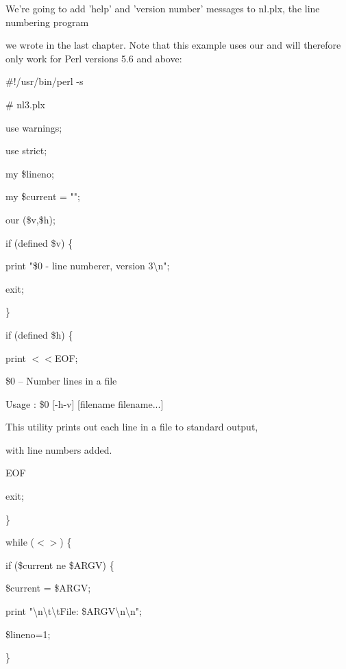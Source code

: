 \documentclass[a4paper,11pt]{book}
\begin{document}
\noindent 

\noindent We're going to add 'help' and 'version number' messages to nl.plx, the line numbering program

\noindent we wrote in the last chapter. Note that this example uses our and will therefore only work for Perl versions 5.6 and above:

\noindent 

\noindent \#!/usr/bin/perl -s

\noindent \# nl3.plx

\noindent use warnings;

\noindent use strict;

\noindent 

\noindent my \$lineno;

\noindent my \$current = "";

\noindent our (\$v,\$h);

\noindent 

\noindent if (defined \$v) \{

\noindent print "\$0 - line numberer, version 3\textbackslash n";

\noindent exit;

\noindent \}

\noindent if (defined \$h) \{

\noindent print $<$$<$EOF;

\noindent \$0 -- Number lines in a file

\noindent 

\noindent Usage : \$0 [-h\textbar -v] [filename filename...]

\noindent 

\noindent This utility prints out each line in a file to standard output,

\noindent with line numbers added.

\noindent EOF

\noindent exit;

\noindent \}

\noindent 

\noindent while ($<$$>$) \{

\noindent if (\$current ne \$ARGV) \{

\noindent \$current = \$ARGV;

\noindent print "\textbackslash n\textbackslash t\textbackslash tFile: \$ARGV\textbackslash n\textbackslash n";

\noindent \$lineno=1;

\noindent \}
\end{document}
